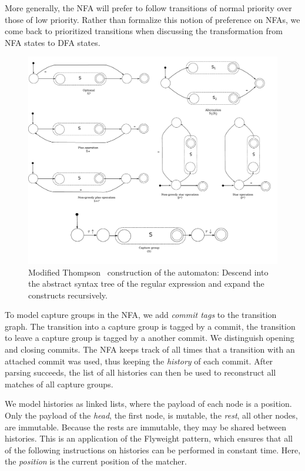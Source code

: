 \documentclass[11pt]{Thesis}
\theoremstyle{definition}
\begin{document}
More generally, the NFA will prefer to follow transitions of normal
priority over those of low priority. Rather than formalize this
notion of preference on NFAs, we come back to prioritized transitions when
discussing the transformation from NFA states to DFA states.

\begin{figure}[tb] \includegraphics[width=\linewidth]{graphs/thompson}
\caption{Modified Thompson~\cite{Thom68a} construction of the
automaton: Descend into the abstract syntax tree of the regular
expression and expand the constructs recursively.}
\label{fig:thompson-construction} 
\end{figure}

To model capture groups in the NFA, we add \emph{commit tags} to
the transition graph. The transition into a capture group is tagged
by a commit, the transition to leave a capture group is tagged by
a another commit. We distinguish opening and closing commits. The
NFA keeps track of all times that a transition with an attached
commit was used, thus keeping the \emph{history} of each commit.
After parsing succeeds, the list of all histories can then be used
to reconstruct all matches of all capture groups.

We model histories as linked lists, where the payload of each node
is a position.  Only the payload of the \emph{head}, the first node,
is mutable, the \emph{rest}, all other nodes, are immutable.  Because
the rests are immutable, they may be shared between histories.  This
is an application of the Flyweight pattern, which ensures that all
of the following instructions on histories can be performed in
constant time. Here, the \emph{position} is the current position
of the matcher.
\end{document}
